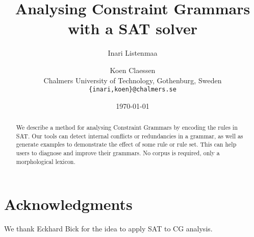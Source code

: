\documentclass[11pt]{article}
\title{Analysing Constraint Grammars with a SAT solver}
\author{Inari Listenmaa \and Koen Claessen \\
 Chalmers University of Technology, Gothenburg, Sweden \\
 {\tt \{inari,koen\}@chalmers.se} }
\date{\today}
\begin{document}
\maketitle

\begin{abstract}
We describe a method for
 analysing Constraint Grammars by encoding the
rules in SAT.
Our tools can detect internal conflicts or redundancies in a grammar,
as well as generate examples to demonstrate the effect of some rule or
rule set.
This can help users to diagnose and improve their grammars.
No corpus is required, only a morphological lexicon.
\end{abstract}







\section*{Acknowledgments}
We thank Eckhard Bick for the idea to apply SAT to CG analysis. 




\end{document}
